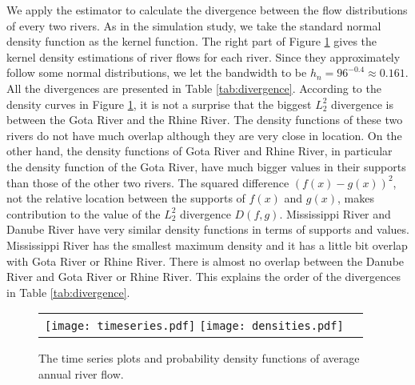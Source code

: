 \documentclass[11pt]{article}
\begin{document}
We apply the estimator to calculate the divergence between the flow distributions of every two rivers. As in the simulation study, we take the standard normal density function as the kernel function. The right part of Figure \ref{fig:7} gives the kernel density estimations of river flows for each river.  Since they  approximately follow some normal distributions, we let the bandwidth to be $h_n=96^{-0.4} \approx 0.161$. All the divergences are presented in Table \ref{tab:divergence}.  According to the density curves in Figure \ref{fig:7}, it is not a surprise that the biggest $L^2_2$ divergence is between the Gota River and the Rhine River. The density functions of these two rivers do not have much overlap although they are very close in location. On the other hand, the density functions of  Gota River and  Rhine River, in particular the density function of the Gota River,  have much bigger values in their supports than those of the other two rivers. The squared difference $(f(x)-g(x))^2$, not the relative location between the supports of $f(x)$ and $g(x)$, makes contribution to the value of the $L^2_2$ divergence $D(f,g)$. Mississippi River and Danube River have very similar density functions in terms of supports and values. Mississippi River has the smallest maximum density and it has a little bit overlap with Gota River or  Rhine River. There is almost no overlap between the Danube River and Gota River or  Rhine River. This explains the order of the divergences in Table \ref{tab:divergence}.

\begin{figure}[H]
\centering
\begin{tabular}{cc}
\texttt{[image: timeseries.pdf]}
\texttt{[image: densities.pdf]}
\end{tabular}
\caption {The time series plots and probability density functions of average annual river flow. \label{fig:7}}
\end{figure}
\end{document}
